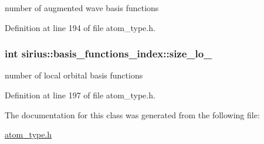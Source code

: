 number of augmented wave basis functions 



Definition at line 194 of file atom\+\_\+type.\+h.

\hypertarget{classsirius_1_1basis__functions__index_a52fffa1e907f3ef0d65dea8e93869db7}{}
\subsubsection[{size\+\_\+lo\+\_\+}]{\setlength{\rightskip}{0pt plus 5cm}int sirius\+::basis\+\_\+functions\+\_\+index\+::size\+\_\+lo\+\_\+\hspace{0.3cm}{\ttfamily [private]}}\label{classsirius_1_1basis__functions__index_a52fffa1e907f3ef0d65dea8e93869db7}


number of local orbital basis functions 



Definition at line 197 of file atom\+\_\+type.\+h.



The documentation for this class was generated from the following file\+:\begin{DoxyCompactItemize}
\item 
\hyperlink{atom__type_8h}{atom\+\_\+type.\+h}\end{DoxyCompactItemize}
